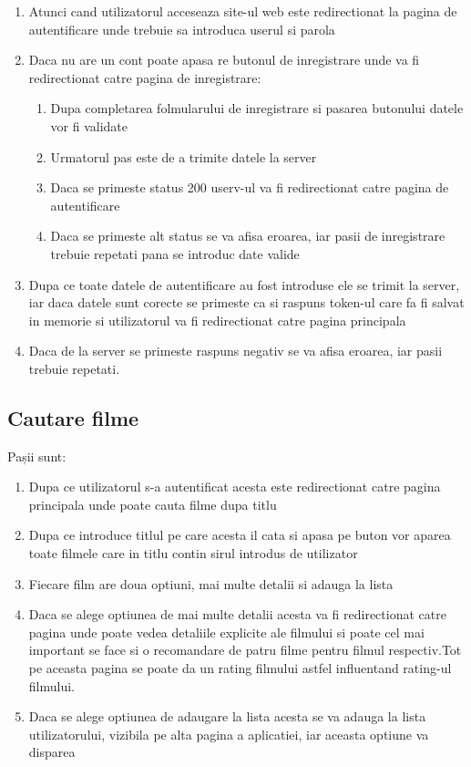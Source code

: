 \begin{enumerate}
  	\item Atunci cand utilizatorul acceseaza site-ul web este redirectionat la pagina de autentificare unde trebuie sa introduca userul si parola
	\item Daca nu are un cont poate apasa re butonul de inregistrare unde va fi redirectionat catre pagina de inregistrare:
		\begin{enumerate}
		  	\item Dupa completarea folmularului de inregistrare si pasarea butonului datele vor fi validate
			\item Urmatorul pas este de a trimite datele la server
			\item Daca se primeste status 200 userv-ul va fi redirectionat catre pagina de autentificare
			\item Daca se primeste alt status se va afisa eroarea, iar pasii de inregistrare trebuie repetati pana se introduc date valide	
		\end{enumerate}
	\item Dupa ce toate datele de autentificare au fost introduse ele se trimit la server, iar daca datele sunt corecte se primeste ca si raspuns token-ul care fa fi salvat in memorie si utilizatorul va fi redirectionat catre pagina principala
	\item Daca de la server se primeste raspuns negativ se va afisa eroarea, iar pasii trebuie repetati.
\end{enumerate}

\subsection{Cautare filme}
\par Pașii sunt:

\begin{enumerate}
  	\item Dupa ce utilizatorul s-a autentificat acesta este redirectionat catre pagina principala unde poate cauta filme dupa titlu
	\item Dupa ce introduce titlul pe care acesta il cata si apasa pe buton vor aparea toate filmele care in titlu contin sirul introdus de utilizator
	\item Fiecare film are doua optiuni, mai multe detalii si adauga la lista
	\item Daca se alege optiunea de mai multe detalii acesta va fi redirectionat catre pagina unde poate vedea detaliile explicite ale filmului si poate cel mai important se face si o recomandare de patru filme pentru filmul respectiv.Tot pe aceasta pagina se poate da un rating filmului astfel influentand rating-ul filmului.
	\item Daca se alege optiunea de adaugare la lista acesta se va adauga la lista utilizatorului, vizibila pe alta pagina a aplicatiei, iar aceasta optiune va disparea
\end{enumerate}


